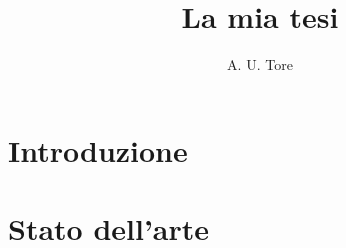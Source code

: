 \documentclass[a4paper,titlepage]{amsbook}
\title{La mia tesi}
\author{A. U. Tore}
\begin{document}
\maketitle

\frontmatter
\tableofcontents

\chapter*{Introduzione}
\lipsum

\mainmatter
\chapter{Stato dell'arte}
\lipsum

\backmatter
\end{document}
